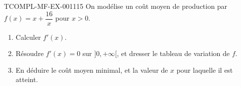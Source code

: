 \begin{exercice}{TCOMPL-MF-EX-001}{1}{15}
On modélise un coût moyen de production par $f(x) = x + \dfrac{16}{x}$ pour $x>0$.
\begin{enumerate}
  \item Calculer $f'(x)$.
  \item Résoudre $f'(x)=0$ sur $]0,+\infty[$, et dresser le tableau de variation de $f$.
  \item En déduire le coût moyen minimal, et la valeur de $x$ pour laquelle il est atteint.
\end{enumerate}
\end{exercice}
